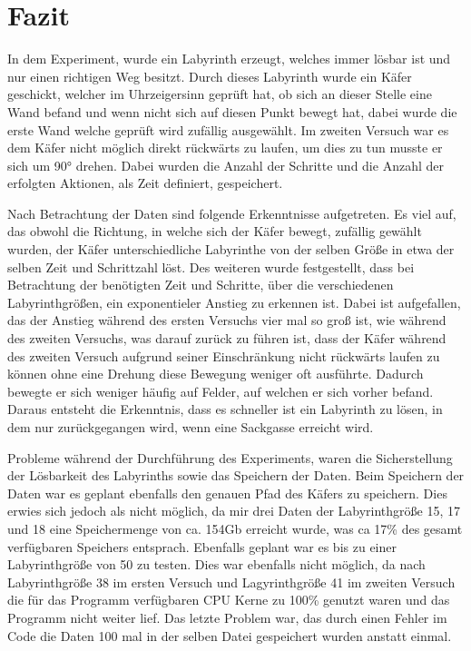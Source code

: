 \documentclass[12pt, a4paper, titlepage]{article}
\begin{document}
\section{Fazit}

In dem Experiment, wurde ein Labyrinth erzeugt, welches immer lösbar ist und nur einen richtigen Weg besitzt.
Durch dieses Labyrinth wurde ein Käfer geschickt, welcher im Uhrzeigersinn geprüft hat, ob sich an dieser Stelle eine Wand befand und wenn nicht sich auf diesen Punkt bewegt hat, dabei wurde die erste Wand welche geprüft wird zufällig ausgewählt.
Im zweiten Versuch war es dem Käfer nicht möglich direkt rückwärts zu laufen, um dies zu tun musste er sich um 90° drehen.
Dabei wurden die Anzahl der Schritte und die Anzahl der erfolgten Aktionen, als Zeit definiert, gespeichert.


\bigskip

Nach Betrachtung der Daten sind folgende Erkenntnisse aufgetreten.
Es viel auf, das obwohl die Richtung, in welche sich der Käfer bewegt, zufällig gewählt wurden, der Käfer unterschiedliche Labyrinthe von der selben Größe in etwa der selben Zeit und Schrittzahl löst.
Des weiteren wurde festgestellt, dass bei Betrachtung der benötigten Zeit und Schritte, über die verschiedenen Labyrinthgrößen, ein exponentieler Anstieg zu erkennen ist.
Dabei ist aufgefallen, das der Anstieg während des ersten Versuchs vier mal so groß ist, wie während des zweiten Versuchs, was darauf zurück zu führen ist, dass der Käfer während des zweiten Versuch aufgrund seiner Einschränkung nicht rückwärts laufen zu können ohne eine Drehung diese Bewegung weniger oft ausführte.
Dadurch bewegte er sich weniger häufig auf Felder, auf welchen er sich vorher befand.
Daraus entsteht die Erkenntnis, dass es schneller ist ein Labyrinth zu lösen, in dem nur zurückgegangen wird, wenn eine Sackgasse erreicht wird.

\bigskip

Probleme während der Durchführung des Experiments, waren die Sicherstellung der Lösbarkeit des Labyrinths sowie das Speichern der Daten.
Beim Speichern der Daten war es geplant ebenfalls den genauen Pfad des Käfers zu speichern.
Dies erwies sich jedoch als nicht möglich, da mir drei Daten der Labyrinthgröße 15, 17 und 18 eine Speichermenge von ca. 154Gb erreicht wurde, was ca 17\% des gesamt verfügbaren Speichers entsprach.
Ebenfalls geplant war es bis zu einer Labyrinthgröße von 50 zu testen.
Dies war ebenfalls nicht möglich, da nach Labyrinthgröße 38 im ersten Versuch und Lagyrinthgröße 41 im zweiten Versuch die für das Programm verfügbaren CPU Kerne zu 100\% genutzt waren und das Programm nicht weiter lief.
Das letzte Problem war, das durch einen Fehler im Code die Daten 100 mal in der selben Datei gespeichert wurden anstatt einmal.

\newpage

\printbibliography 
\end{document}
